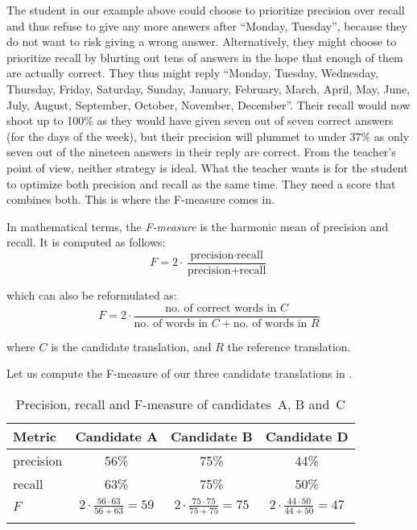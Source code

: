 \documentclass[output=paper]{langscibook}
\begin{document}
The student in our example above could choose to prioritize precision over recall and thus refuse to give any more answers after “Monday, Tuesday”, because they do not want to risk giving a wrong answer. Alternatively, they might choose to prioritize recall by blurting out tens of answers in the hope that enough of them are actually correct. They thus might reply “Monday, Tuesday, Wednesday, Thursday, Friday, Saturday, Sunday, January, February, March, April, May, June, July, August, September, October, November, December”. Their recall would now shoot up to 100\% as they would have given seven out of seven correct answers (for the days of the week), but their precision will plummet to under 37\% as only seven out of the nineteen answers in their reply are correct. From the teacher’s point of view, neither strategy is ideal. What the teacher wants is for the student to optimize both precision and recall as the same time. They need a score that combines both. This is where the F-measure comes in.

In mathematical terms, the \textit{F-measure} is the harmonic mean of precision and recall. It is computed as follows:
\begin{equation}
F =2 \cdot \frac{\text{precision} \cdot \text{recall}}{\text{precision}+\text{recall}}
\end{equation}

\noindent which can also be reformulated as:
\begin{equation}
F=2 \cdot \frac{\text{no. of correct words in } C}{\text{no. of words in }C+\text{no. of words in } R}
\end{equation}

where $C$ is the candidate translation, and $R$ the reference translation.

Let us compute the F-measure of our three candidate translations in .


\begin{table}
\begin{tabular}{lccc}
\lsptoprule
{Metric} & {Candidate A} & {Candidate B} & {Candidate D}\\
\midrule
precision & 56\% & 75\% & 44\%\\
recall & 63\% & 75\% & 50\%\\
$F$ & $2{\cdot}\frac{56{\cdot}63}{56+63}=59$ & $2{\cdot}\frac{75{\cdot}75}{75+75}=75$ & $2{\cdot}\frac{44{\cdot}50}{44+50}=47$\\
\lspbottomrule
\end{tabular}
\caption{Precision, recall and F-measure of candidates~A, B and~C\label{tab:rossi:4}}
\end{table}
\end{document}
